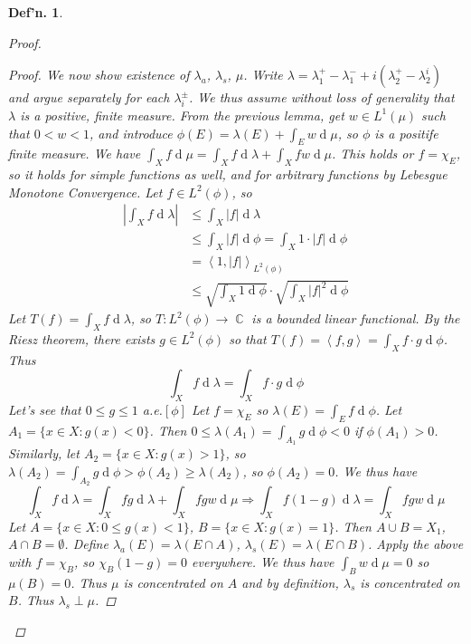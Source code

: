 \documentclass[12pt, a4paper]{book}
\DeclareMathOperator{\C}{\mathbb{C}}
\renewcommand{\d}[1]{\ensuremath{\operatorname{d}\!{#1}}} %
\newcommand{\inner}[2]{\left\langle #1, #2 \right\rangle} %
\newtheorem{definition}[theorem]{Def'n.}
\theoremstyle{nonumberplain}
\newtheorem{proof}{Proof}
\begin{document}
\begin{definition}
\begin{proof}
\begin{proof}
    We now show existence of $\lambda_a$, $\lambda_s$, $\mu$.
    Write $\lambda=\lambda_1^+-\lambda_1^-+i(\lambda_2^+-\lambda_2^i)$ and argue separately for each $\lambda_i^\pm$.
    We thus assume without loss of generality that $\lambda$ is a positive, finite measure.
    From the previous lemma, get $w\in L^1(\mu)$ such that $0<w<1$, and introduce $\phi(E)=\lambda(E)+\int_E w\d{\mu}$, so $\phi$ is a positife finite measure.
    We have $\int_X f\d{\mu}=\int_X f\d{\lambda}+\int_X fw\d{\mu}$.
    This holds or $f=\chi_E$, so it holds for simple functions as well, and for arbitrary functions by Lebesgue Monotone Convergence.
    Let $f\in L^2(\phi)$, so
    \begin{align*}
        \left\lvert \int_X f\d{\lambda}\right\rvert &\leq \int_X|f|\d{\lambda}\\
                                                    &\leq\int_X|f|\d{\phi}=\int_X 1\cdot|f|\d{\phi}\\
                                                    &= \inner{1}{|f|}_{L^2(\phi)}\\
                                                    &\leq\sqrt{\int_X 1\d{\phi}}\cdot\sqrt{\int_X|f|^2\d{\phi}}
    \end{align*}
    Let $T(f)=\int_X f\d{\lambda}$, so $T:L^2(\phi)\to\C$ is a bounded linear functional.
    By the Riesz theorem, there exists $g\in L^2(\phi)$ so that $T(f)=\inner{f}{g}=\int_Xf\cdot g\d{\phi}$.
    Thus
    \[\int_X f\d{\lambda}=\int_X f\cdot g\d{\phi}\]
    Let's see that $0\leq g\leq 1$ a.e.$[\phi]$
    Let $f=\chi_E$ so $\lambda(E)=\int_E f\d{\phi}$.
    Let $A_1=\{x\in X:g(x)<0\}$.
    Then $0\leq \lambda(A_1)=\int_{A_1}g\d{\phi}<0$ if $\phi(A_1)>0$.
    Similarly, let $A_2=\{x\in X:g(x)>1\}$, so $\lambda(A_2)=\int_{A_2}g\d{\phi}>\phi(A_2)\geq\lambda(A_2)$, so $\phi(A_2)=0$.
    We thus have
    \[\int_X f\d{\lambda}=\int_X fg\d{\lambda}+\int_X fgw\d{\mu}\Rightarrow\int_X f(1-g)\d{\lambda}=\int_X fgw\d{\mu}\]
    Let $A=\{x\in X:0\leq g(x)<1\}$, $B=\{x\in X:g(x)=1\}$.
    Then $A\cup B=X_1$, $A\cap B=\emptyset$.
    Define $\lambda_a(E)=\lambda(E\cap A)$, $\lambda_s(E)=\lambda(E\cap B)$.
    Apply the above with $f=\chi_B$, so $\chi_B(1-g)=0$ everywhere.
    We thus have $\int_B w\d{\mu}=0$ so $\mu(B)=0$.
    Thus $\mu$ is concentrated on $A$ and by definition, $\lambda_s$ is concentrated on $B$.
    Thus $\lambda_s\perp\mu$.


\end{proof}
\end{proof}
\end{definition}
\end{document}
